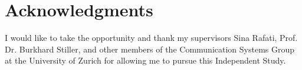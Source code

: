 \chapter*{Acknowledgments}

I would like to take the opportunity and thank my supervisors Sina Rafati, Prof. Dr. Burkhard Stiller, and other members of the Communication Systems Group at the University of Zurich for allowing me to pursue this Independent Study.